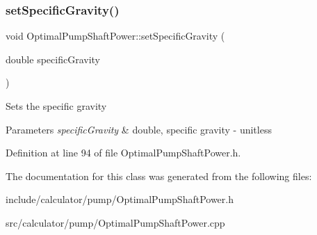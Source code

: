 \subsubsection{\texorpdfstring{set\+Specific\+Gravity()}{setSpecificGravity()}}
{\footnotesize\ttfamily void Optimal\+Pump\+Shaft\+Power\+::set\+Specific\+Gravity (\begin{DoxyParamCaption}\item[{double}]{specific\+Gravity }\end{DoxyParamCaption})\hspace{0.3cm}{\ttfamily [inline]}}

Sets the specific gravity 
\begin{DoxyParams}{Parameters}
{\em specific\+Gravity} & double, specific gravity -\/ unitless \\
\hline
\end{DoxyParams}


Definition at line 94 of file Optimal\+Pump\+Shaft\+Power.\+h.



The documentation for this class was generated from the following files\+:\begin{DoxyCompactItemize}
\item 
include/calculator/pump/Optimal\+Pump\+Shaft\+Power.\+h\item 
src/calculator/pump/Optimal\+Pump\+Shaft\+Power.\+cpp\end{DoxyCompactItemize}
